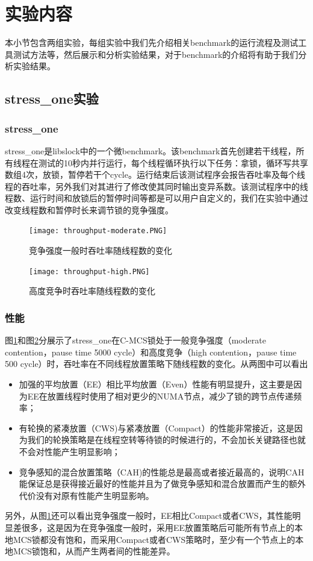 \section{实验内容}
本小节包含两组实验，每组实验中我们先介绍相关benchmark的运行流程及测试工具测试方法等，然后展示和分析实验结果，对于benchmark的介绍将有助于我们分析实验结果。

\subsection{stress\_one实验}
\subsubsection{stress\_one}
stress\_one是libslock\cite{david2013everything}中的一个微benchmark。该benchmark首先创建若干线程，所有线程在测试的10秒内并行运行，每个线程循环执行以下任务：拿锁，循环写共享数组4次，放锁，暂停若干个cycle。运行结束后该测试程序会报告吞吐率及每个线程的吞吐率，另外我们对其进行了修改使其同时输出变异系数。该测试程序中的线程数、运行时间和放锁后的暂停时间等都是可以用户自定义的，我们在实验中通过改变线程数和暂停时长来调节锁的竞争强度。

\begin{figure}[t]
	\centering
	\texttt{[image: throughput-moderate.PNG]}
	\caption{竞争强度一般时吞吐率随线程数的变化}
	\label{Fig:throughput-moderate}
\end{figure}

\begin{figure}[t]
	\centering
	\texttt{[image: throughput-high.PNG]}
	\caption{高度竞争时吞吐率随线程数的变化}
	\label{Fig:throughput-high}
\end{figure}

\subsubsection{性能}
图\ref{Fig:throughput-moderate}和图\ref{Fig:throughput-high}分展示了stress\_one在C-MCS锁处于一般竞争强度（moderate contention，pause time 5000 cycle）和高度竞争（high contention，pause time 500 cycle）时，吞吐率在不同线程放置策略下随线程数的变化。从两图中可以看出
\begin{itemize}
\item  加强的平均放置（EE）相比平均放置（Even）性能有明显提升，这主要是因为EE在放置线程时使用了相对更少的NUMA节点，减少了锁的跨节点传递频率；
\item  有轮换的紧凑放置（CWS)与紧凑放置（Compact）的性能非常接近，这是因为我们的轮换策略是在线程空转等待锁的时候进行的，不会加长关键路径也就不会对性能产生明显影响；
\item  竞争感知的混合放置策略（CAH)的性能总是最高或者接近最高的，说明CAH能保证总是获得接近最好的性能并且为了做竞争感知和混合放置而产生的额外代价没有对原有性能产生明显影响。
\end{itemize}
另外，从图\ref{Fig:throughput-moderate}还可以看出竞争强度一般时，EE相比Compact或者CWS，其性能明显差很多，这是因为在竞争强度一般时，采用EE放置策略后可能所有节点上的本地MCS锁都没有饱和，而采用Compact或者CWS策略时，至少有一个节点上的本地MCS锁饱和，从而产生两者间的性能差异。


